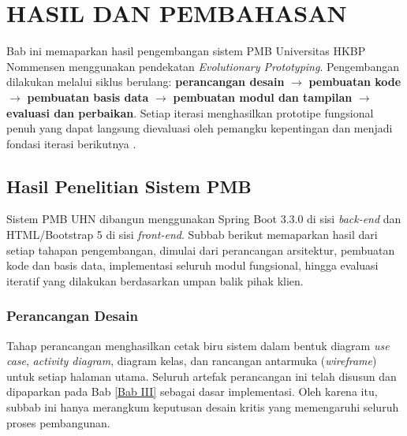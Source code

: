 \newpage
\chapter{HASIL DAN PEMBAHASAN} \label{Bab IV}

Bab ini memaparkan hasil pengembangan sistem PMB Universitas HKBP Nommensen menggunakan pendekatan \textit{Evolutionary Prototyping}. Pengembangan dilakukan melalui siklus berulang: \textbf{perancangan desain} $\rightarrow$ \textbf{pembuatan kode} $\rightarrow$ \textbf{pembuatan basis data} $\rightarrow$ \textbf{pembuatan modul dan tampilan} $\rightarrow$ \textbf{evaluasi dan perbaikan}. Setiap iterasi menghasilkan prototipe fungsional penuh yang dapat langsung dievaluasi oleh pemangku kepentingan dan menjadi fondasi iterasi berikutnya \cite{crinnion1991evolutionary}.\par

\section{Hasil Penelitian Sistem PMB} \label{IV.HasilPenelitian}

Sistem PMB UHN dibangun menggunakan Spring Boot 3.3.0 di sisi \textit{back-end} dan HTML/Bootstrap 5 di sisi \textit{front-end}. Subbab berikut memaparkan hasil dari setiap tahapan pengembangan, dimulai dari perancangan arsitektur, pembuatan kode dan basis data, implementasi seluruh modul fungsional, hingga evaluasi iteratif yang dilakukan berdasarkan umpan balik pihak klien.\par

\subsection{Perancangan Desain} \label{IV.PerancanganDesain}

Tahap perancangan menghasilkan cetak biru sistem dalam bentuk diagram \textit{use case}, \textit{activity diagram}, diagram kelas, dan rancangan antarmuka (\textit{wireframe}) untuk setiap halaman utama. Seluruh artefak perancangan ini telah disusun dan dipaparkan pada Bab \ref{Bab III} sebagai dasar implementasi. Oleh karena itu, subbab ini hanya merangkum keputusan desain kritis yang memengaruhi seluruh proses pembangunan.\par

